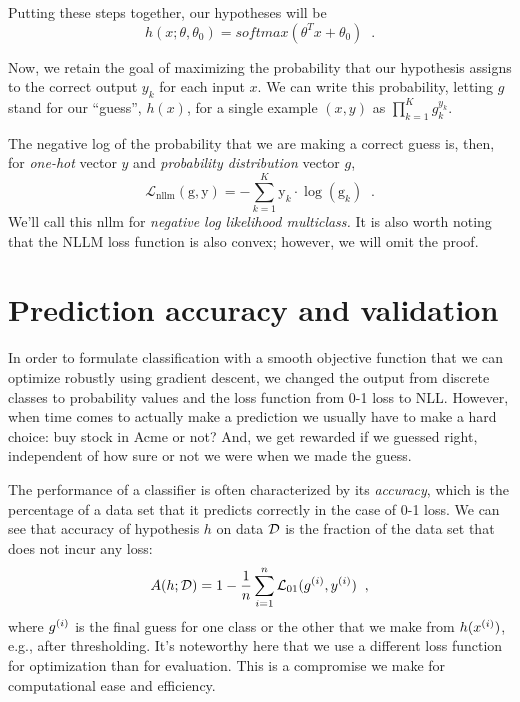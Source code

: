   Putting these steps together, our hypotheses will be
  \[h(x; \theta, \theta_0) = \textit{softmax}(\theta^T x + \theta_0)\;\;.\]

  Now, we retain the goal of maximizing the probability that our
  hypothesis assigns to the correct output $y_k$ for each input $x$.  We
  can write this probability, letting $g$ stand for our ``guess'', $h(x)$, for a
  single example $(x, y)$ as $\prod_{k = 1}^K g_k^{y_k}$.

  The negative log of the probability that we are making a correct guess is, then, for {\em one-hot} vector $y$ and {\em probability distribution}
  vector $g$,
  $$\mathcal{L}_\text{nllm}(\text{g},\text{y}) =
    - \sum_{k=1}^K \text{y}_k \cdot \log(\text{g}_k) \;\;.$$
  We'll call this {\sc nllm} for {\em negative log likelihood
      multiclass.} It is also worth noting that the NLLM loss function is also convex; however, we will omit the proof.

  \section{Prediction accuracy and validation}

  In order to formulate classification with a smooth objective function
  that we can optimize robustly using gradient descent, we changed the
  output from discrete classes to probability values and the loss
  function from 0-1 loss to NLL.
  However, when time comes to actually make a prediction we usually have
  to make a hard choice:  buy stock in Acme or not?  And, we get
  rewarded if we guessed right, independent of how sure or not we were
  when we made the guess.

  The performance of a classifier is often characterized by its {\em
      accuracy}, which is the percentage of a data set that it predicts
  correctly in the case of 0-1 loss. We can see that accuracy of hypothesis $h$ on data ${\cal D}$
  is the fraction of the data set that does not incur any loss:
  \[A(h; {\cal D}) = 1 - \frac{1}{n}\sum_{i=1}^n\mathcal{L}_{01}(g^{(i)}, y^{(i)})\;\;,\]
  where $g^{(i)}$ is the final guess for one class or the other
  that we make from $h(x^{(i)})$, e.g., after thresholding.
It's noteworthy here that we use a different loss function for optimization
than for evaluation. This is a compromise we make for computational
ease and efficiency.





